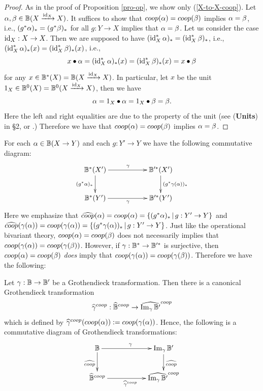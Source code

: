 \documentclass[a4paper]{amsart}
\begin{document}
\begin{proof}
 As in the proof of Proposition \ref{pro-op}, we show only (\ref{X-to-X-coop}).  Let $\alpha, \beta \in \mathbb B(X \xrightarrow {\operatorname{id}_X} X)$. It suffices to show that $coop(\alpha) =coop(\beta)$ implies $\alpha = \beta$, i.e., $(g^*\alpha)_* =(g^*\beta)_*$ for all $g:Y \to X$ implies that $\alpha = \beta$. Let us consider the case $\operatorname{id}_X:X \to X$. Then we are supposed to have $(\operatorname{id}_X^*\alpha)_* =(\operatorname{id}_X^*\beta)_*$, i.e., $(\operatorname{id}_X^*\alpha)_* (x) =(\operatorname{id}_X^*\beta)_*(x)$, i.e.,
$$x \bullet \alpha = (\operatorname{id}_X^*\alpha)_* (x) = (\operatorname{id}_X^*\beta)_*(x) = x \bullet \beta $$
 for any $x \in \mathbb B^*(X)=\mathbb B(X \xrightarrow {\operatorname{id}_X} X)$. In particular, let $x$ be the unit $1_X \in \mathbb B^0(X)=\mathbb B^0(X \xrightarrow {\operatorname{id}_X} X)$, then we have
 $$ \alpha = 1_X \bullet \alpha = 1_X \bullet \beta = \beta.$$
 Here the left and right equalities are due to the property of the unit (see ({\bf Units}) in \S 2, or \cite[\S 2.2 Axioms for a bivariant theory, p. 22]{FM}.) 
 Therefore we have that $coop(\alpha) =coop(\beta)$ implies $\alpha = \beta$.
 \end{proof} 
For each $\alpha \in \mathbb B(X \to Y)$ and each $g:Y' \to Y$ we have the following commutative diagram:
\begin{equation}\label{indiv-com-co}
\xymatrix
{
\bB^*(X') \ar[d]_{(g^*\alp)_*} \ar[rr]^{\ga}  && \bB'^*(X') \ar[d]^{(g^*\ga(\alp))_*} \\
\bB^*(Y') \ar[rr]_{\ga}  && \bB'^*(Y') 
}
\end{equation}
Here we emphasize that $\widehat{coop}(\alpha) = coop(\alpha) = \{ (g^*\alpha)_* \, | \, g:Y' \to Y\}$ and $\widehat{coop}(\gamma(\alpha)) = coop(\gamma(\alpha)) = \{ (g^*\gamma(\alpha))_* \, | \, g:Y' \to Y\}$. Just like the operational bivariant theory, $coop(\alpha) =coop(\beta)$ does not necessarily implies that 
$coop(\gamma(\alpha)) =coop(\gamma(\beta))$. However, if $\gamma:\mathbb B^* \to \mathbb B'^*$ is surjective, then $coop(\alpha) =coop(\beta)$ \emph{does} imply that 
$coop(\gamma(\alpha)) =coop(\gamma(\beta))$. Therefore we have the following:
\begin{pro}\label{im-t}
Let $\gamma: \mathbb B \to \mathbb B'$ be a Grothendieck transformation. Then there is a canonical Grothendieck transformation
$$\widehat{\gamma}^{coop}: \widehat{\mathbb B}^{coop} \to \widehat{\operatorname{Im}_{\gamma}\mathbb B'}^{coop}$$
which is defined by $\widehat{\gamma}^{coop}(coop(\alpha)):= coop(\gamma(\alpha))$. Hence, the following is a commutative diagram of Grothendieck transformations:
\[
\xymatrix
{
\bB \ar[rr]^{\ga} \ar[d]_{\widehat{coop}} && \op{Im}_{\ga}\bB' \ar[d]^{\widehat{coop}} \\
\widehat{\bB}^{coop} \ar[rr]_{\widehat{\ga}^{coop}} && \widehat{\op{Im}_{\ga}\bB'}^{coop} 
}
\]
\end{pro}
\end{document}
